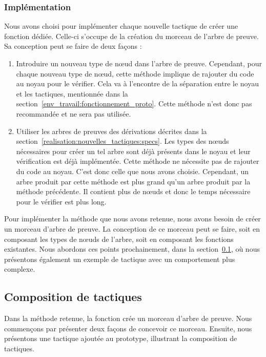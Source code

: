 \documentclass[french,titlepage]{article}
\begin{document}
\subsubsection{Implémentation} \label{realisation:nouvelles_tactiques:implémentation}
Nous avons choisi pour implémenter chaque nouvelle tactique de créer une fonction dédiée. Celle-ci s'occupe de la création du morceau de l'arbre de preuve. Sa conception peut se faire de deux façons :
\begin{enumerate}
    \item Introduire un nouveau type de nœud dans l'arbre de preuve. Cependant, pour chaque nouveau type de nœud, cette méthode implique de rajouter du code au noyau pour le vérifier. Cela va à l'encontre de la séparation entre le noyau et les tactiques, mentionnée dans la section~\ref{env_travail:fonctionnement_proto}. Cette méthode n'est donc pas recommandée et ne sera pas utilisée.
    \item Utiliser les arbres de preuves des dérivations décrites dans la section~\ref{realisation:nouvelles_tactiques:specs}. Les types des nœuds nécessaires pour créer un tel arbre sont déjà présents dans le noyau et leur vérification est déjà implémentée. Cette méthode ne nécessite pas de rajouter du code au noyau. C'est donc celle que nous avons choisie. Cependant, un arbre produit par cette méthode est plus grand qu'un arbre produit par la méthode précédente. Il contient plus de nœuds et donc le temps nécessaire pour le vérifier est plus long.
\end{enumerate}

Pour implémenter la méthode que nous avons retenue, nous avons besoin de créer un morceau d'arbre de preuve. La conception de ce morceau peut se faire, soit en composant les types de nœuds de l'arbre, soit en composant les fonctions existantes. Nous abordons ces points prochainement, dans la section~\ref{realisation:composition_tactiques}, où nous présentons également un exemple de tactique avec un comportement plus complexe.

\subsection{Composition de tactiques} \label{realisation:composition_tactiques}
Dans la méthode retenue, la fonction crée un morceau d'arbre de preuve.
Nous commençons par présenter deux façons de concevoir ce morceau. Ensuite, nous présentons une tactique ajoutée au prototype, illustrant la composition de tactiques.
\end{document}
